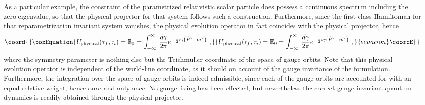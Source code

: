 \documentclass[a4paper,11pt]{article}
\def\proj{\mathbb E}
\begin{document}
As a particular example, the constraint \coordHE{} of the parametrized
relativistic scalar particle does possess a continuous spectrum including
the zero eigenvalue, so that the physical projector for that system
follows such a construction. Furthermore, since the first-class Hamiltonian
\coordHE{} for that reparametrization invariant system vanishes, the
physical evolution operator \coordHE{} in fact
coincides with the physical projector, hence
\begin{equation}\coord{}\boxEquation{
U_{\rm physical}(\tau_f,\tau_i)=\proj_0=\int_{-\infty}^\infty\,
\frac{d\gamma}{2\pi}e^{-\frac{1}{2}i\gamma\left(\hat{P}^2+m^2\right)}\ ,
}{
U_{\rm physical}(\tau_f,\tau_i)=\proj_0=\int_{-\infty}^\infty\,
\frac{d\gamma}{2\pi}e^{-\frac{1}{2}i\gamma\left(\hat{P}^2+m^2\right)}\ ,
}{ecuacion}\coordE{}\end{equation}
where the symmetry parameter \myHighlight{$\gamma$}\coordHE{} is nothing else but the
Teichm\"uller coordinate of the space of gauge orbits. Note that this
physical evolution operator is independent of the world-line \myHighlight{$\tau$}\coordHE{}
coordinate, as it should on account of the gauge invariance
of the formulation. Furthermore, the integration over the space of gauge
orbits is indeed admissible, since each of the gauge orbits are accounted
for with an equal relative weight, hence once and only once. No gauge fixing
has been effected, but nevertheless the correct gauge invariant quantum
dynamics is readily obtained through the physical projector.
\end{document}
